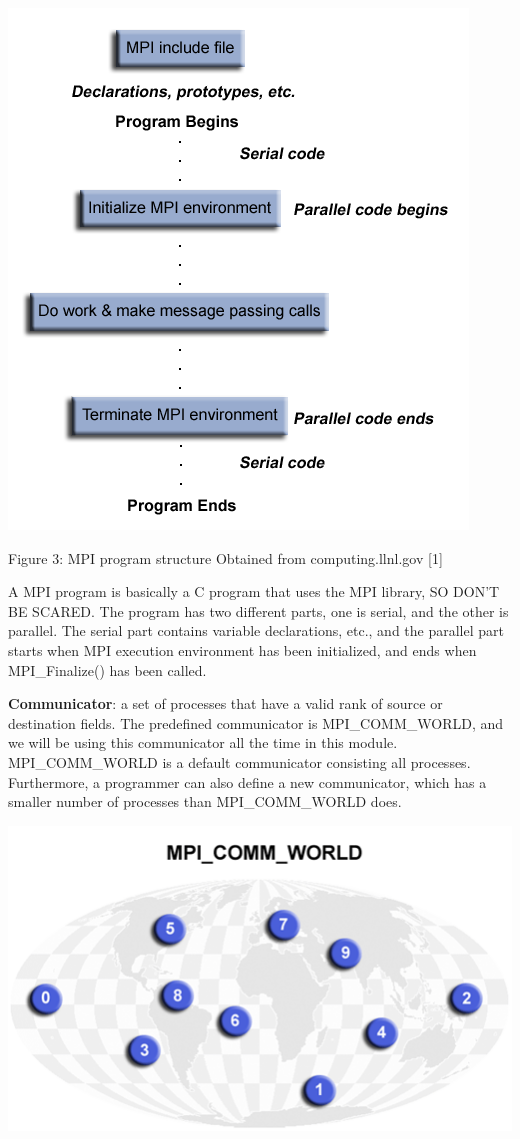 \documentclass[letterpaper,10pt,openany,oneside]{sphinxmanual}
\begin{document}
{\hfill\includegraphics{MPIstructure.png}\hfill}

\begin{center}Figure 3: MPI program structure Obtained from computing.llnl.gov {[}1{]}
\end{center}
A MPI program is basically a C program that uses the MPI library, SO DON’T BE SCARED. The program has two different parts, one is serial, and the other is parallel. The serial part contains variable declarations, etc., and the parallel part starts when MPI execution environment has been initialized, and ends when MPI\_Finalize() has been called.

\textbf{Communicator}: a set of processes that have a valid rank of source or destination fields. The predefined communicator is MPI\_COMM\_WORLD, and we will be using this communicator all the time in this module. MPI\_COMM\_WORLD is a default communicator consisting all processes. Furthermore, a programmer can also define a new communicator, which has a smaller number of processes than MPI\_COMM\_WORLD does.

{\hfill\includegraphics{MPI_COMM_WORLD.png}\hfill}
\end{document}
